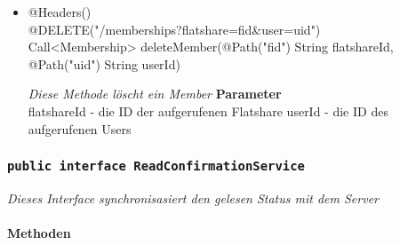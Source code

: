 \documentclass[a4paper]{scrreprt}
\begin{document}
\begin{itemize}
             	      \item{@Headers()\\ @DELETE("/memberships?flatshare={fid}\&user={uid}")\\Call<Membership> deleteMember(@Path("fid") String flatshareId, @Path("uid") String userId)}
        	
      	 	 	\textit{Diese Methode löscht ein Member}        	
        		\textbf{Parameter} \\
        		flatshareId - die ID der aufgerufenen Flatshare 
                userId - die ID des aufgerufenen Users
        	       		             
        	             
       		 \end{itemize}
             
             	\subsubsection{\texttt{public interface  ReadConfirmationService }}
        \textit{ Dieses Interface synchronisasiert den gelesen Status mit dem Server}\\
        \\
		\textbf{Methoden} \\
 			
\end{document}
